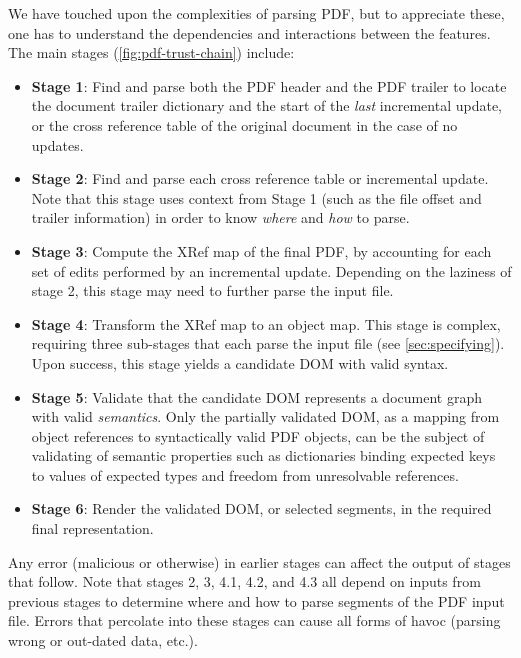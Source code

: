 We have touched upon the complexities of parsing PDF, but to
appreciate these, one has to understand the dependencies and
interactions between the features.  The main stages
(\cref{fig:pdf-trust-chain}) include:
%
\begin{itemize}
\item \textbf{Stage 1}: Find and parse both the PDF header and the PDF trailer to locate
  the document trailer dictionary and the start of the \emph{last} incremental update, or
  the cross reference table of the original document in the case of no updates.
\item \textbf{Stage 2}: Find and parse each cross reference table or incremental update. 
  Note that this stage uses context from Stage 1 (such as the file offset and trailer
  information) in order to know \emph{where} and \emph{how} to parse.
\item \textbf{Stage 3}: Compute the XRef map of the final PDF, by
  accounting for each set of edits performed by an incremental
  update.
  Depending on the laziness of stage 2, this stage may need to further
  parse the input file.
 \item \textbf{Stage 4}: Transform the XRef map to an object map.
   This stage is complex, requiring three sub-stages that each parse
   the input file (see \cref{sec:specifying}).
   Upon success, this stage yields a candidate DOM with valid syntax.
 \item \textbf{Stage 5}: Validate that the candidate DOM represents a
   document graph with valid \emph{semantics}.
   Only the partially validated DOM, as a mapping from object
   references to syntactically valid PDF objects, can be the subject
   of validating of semantic properties such as dictionaries binding
   expected keys to values of expected types and freedom from
   unresolvable references.

\item \textbf{Stage 6}: Render the validated DOM, or selected
  segments, in the required final representation.
\end{itemize}

Any error (malicious or otherwise) in earlier stages can affect the
output of stages that follow.
%
Note that stages 2, 3, 4.1, 4.2, and 4.3 all depend on inputs from
previous stages to determine where and how to parse segments of the
PDF input file.
%
Errors that percolate into these stages can cause all forms of havoc
(parsing wrong or out-dated data, etc.).

